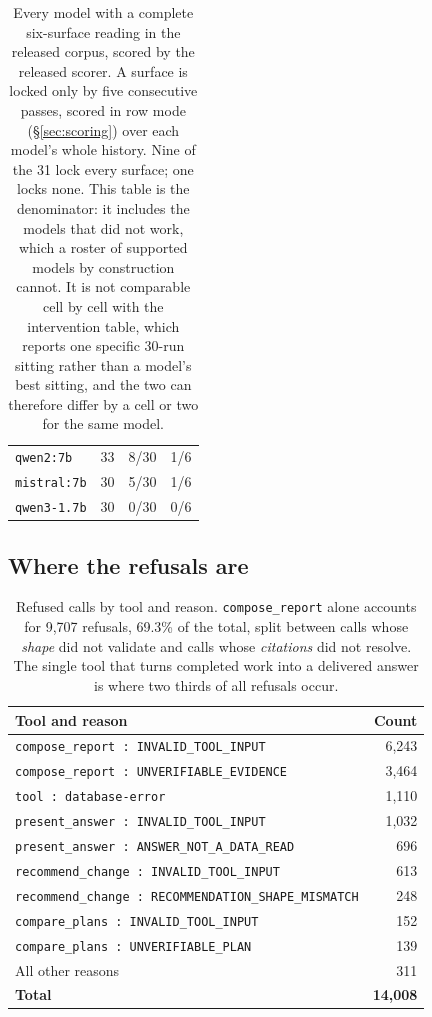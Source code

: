 \documentclass[11pt]{article}
\newcommand{\code}[1]{\texttt{\small #1}}
\begin{document}
\begin{table}[htbp]
\begin{tabular}{@{}lrrr@{}}
\code{qwen2:7b} & 33 & 8/30 & 1/6 \\
\code{mistral:7b} & 30 & 5/30 & 1/6 \\
\code{qwen3-1.7b} & 30 & 0/30 & 0/6 \\
\bottomrule
\end{tabular}
\caption{Every model with a complete six-surface reading in the released corpus, scored by the released scorer.
A surface is locked only by five consecutive passes, scored in row mode (\S\ref{sec:scoring}) over each
model's whole history. Nine of the 31 lock every surface; one locks none. This table is the denominator: it
includes the models that did not work, which a roster of supported models by construction cannot. It is not
comparable cell by cell with the intervention table, which reports one specific 30-run sitting rather than a
model's best sitting, and the two can therefore differ by a cell or two for the same model.}
\label{tab:leaderboard}
\end{table}

\subsection{Where the refusals are}

\begin{table}[htbp]
\centering\small
\begin{tabular}{@{}lr@{}}
\toprule
Tool and reason & Count \\
\midrule
\code{compose\_report : INVALID\_TOOL\_INPUT} & 6{,}243 \\
\code{compose\_report : UNVERIFIABLE\_EVIDENCE} & 3{,}464 \\
\code{tool : database-error} & 1{,}110 \\
\code{present\_answer : INVALID\_TOOL\_INPUT} & 1{,}032 \\
\code{present\_answer : ANSWER\_NOT\_A\_DATA\_READ} & 696 \\
\code{recommend\_change : INVALID\_TOOL\_INPUT} & 613 \\
\code{recommend\_change : RECOMMENDATION\_SHAPE\_MISMATCH} & 248 \\
\code{compare\_plans : INVALID\_TOOL\_INPUT} & 152 \\
\code{compare\_plans : UNVERIFIABLE\_PLAN} & 139 \\
\midrule
All other reasons & 311 \\
\textbf{Total} & \textbf{14{,}008} \\
\bottomrule
\end{tabular}
\caption{Refused calls by tool and reason. \code{compose\_report} alone accounts for 9{,}707 refusals, 69.3\% of
the total, split between calls whose \emph{shape} did not validate and calls whose \emph{citations} did not
resolve. The single tool that turns completed work into a delivered answer is where two thirds of all refusals
occur.}
\end{table}
\end{document}
